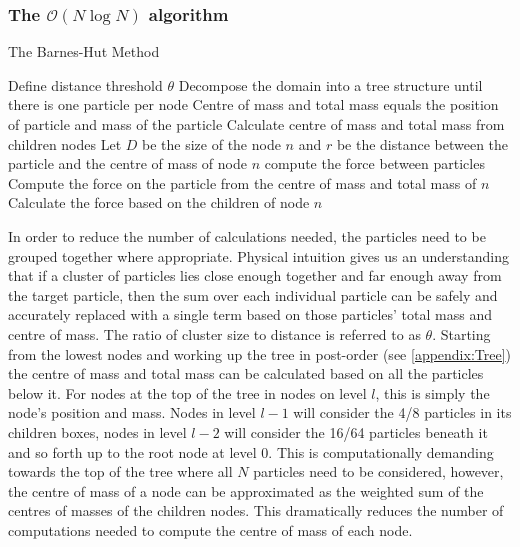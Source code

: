 \subsubsection{\texorpdfstring{The $\mathcal{O}(N\log N)$ algorithm}{The O(NlogN) algorithm}}

\begin{algorithm}
\caption{The Barnes-Hut Method}\label{alg:BarnesHut}
\begin{algorithmic}
\State Define distance threshold $\theta$
\State Decompose the domain into a tree structure until there is one particle per node
\State Centre of mass and total mass equals the position of particle and mass of the particle
\Else 
\State Calculate centre of mass and total mass from children nodes
\EndIf
\EndFor
{}
\State Let $D$ be the size of the node $n$ and $r$ be the distance between the particle and the centre of mass of node $n$
\State compute the force between particles 
\Else
{}
\State Compute the force on the particle from the centre of mass and total mass  
\State of $n$
\Else
\State Calculate the force based on the children of node $n$
\EndIf
\EndIf
\EndFor
\end{algorithmic}
\end{algorithm}

In order to reduce the number of calculations needed, the particles need to be grouped together where appropriate. Physical intuition gives us an understanding that if a cluster of particles lies close enough together and far enough away from the target particle, then the sum over each individual particle can be safely and accurately replaced with a single term based on those particles' total mass and centre of mass. The ratio of cluster size to distance is referred to as $\theta$. 
Starting from the lowest nodes and working up the tree in post-order (see \cref{appendix:Tree}) the centre of mass and total mass can be calculated based on all the particles below it. For nodes at the top of the tree in nodes on level $l$, this is simply the node's position and mass. Nodes in level $l-1$ will consider the 4/8 particles in its children boxes, nodes in level $l-2$ will consider the 16/64 particles beneath it and so forth up to the root node at level $0$. This is computationally demanding towards the top of the tree where all $N$ particles need to be considered, however, the centre of mass of a node can be approximated as the weighted sum of the centres of masses of the children nodes. This dramatically reduces the number of computations needed to compute the centre of mass of each node. 

